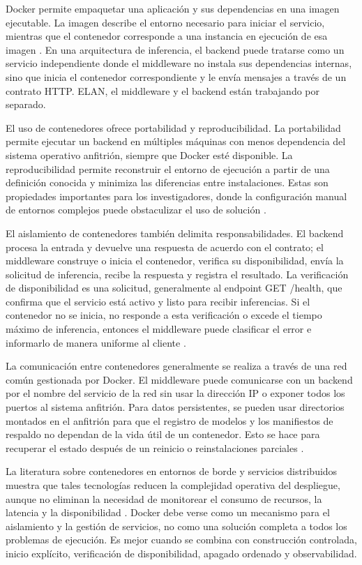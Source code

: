 Docker permite empaquetar una aplicación y sus dependencias en una imagen ejecutable. La imagen describe el entorno necesario para iniciar el servicio, mientras que el contenedor corresponde a una instancia en ejecución de esa imagen \cite{docker2026overview}. En una arquitectura de inferencia, el backend puede tratarse como un servicio independiente donde el middleware no instala sus dependencias internas, sino que inicia el contenedor correspondiente y le envía mensajes a través de un contrato HTTP. ELAN, el middleware y el backend están trabajando por separado.

El uso de contenedores ofrece portabilidad y reproducibilidad. La portabilidad permite ejecutar un backend en múltiples máquinas con menos dependencia del sistema operativo anfitrión, siempre que Docker esté disponible. La reproducibilidad permite reconstruir el entorno de ejecución a partir de una definición conocida y minimiza las diferencias entre instalaciones. Estas son propiedades importantes para los investigadores, donde la configuración manual de entornos complejos puede obstaculizar el uso de solución \cite{docker2026overview,gupta2025performance}.

El aislamiento de contenedores también delimita responsabilidades. El backend procesa la entrada y devuelve una respuesta de acuerdo con el contrato; el middleware construye o inicia el contenedor, verifica su disponibilidad, envía la solicitud de inferencia, recibe la respuesta y registra el resultado. La verificación de disponibilidad es una solicitud, generalmente al endpoint GET /health, que confirma que el servicio está activo y listo para recibir inferencias. Si el contenedor no se inicia, no responde a esta verificación o excede el tiempo máximo de inferencia, entonces el middleware puede clasificar el error e informarlo de manera uniforme al cliente \cite{docker2026overview}.

La comunicación entre contenedores generalmente se realiza a través de una red común gestionada por Docker. El middleware puede comunicarse con un backend por el nombre del servicio de la red sin usar la dirección IP o exponer todos los puertos al sistema anfitrión. Para datos persistentes, se pueden usar directorios montados en el anfitrión para que el registro de modelos y los manifiestos de respaldo no dependan de la vida útil de un contenedor. Esto se hace para recuperar el estado después de un reinicio o reinstalaciones parciales \cite{docker2026overview}.

La literatura sobre contenedores en entornos de borde y servicios distribuidos muestra que tales tecnologías reducen la complejidad operativa del despliegue, aunque no eliminan la necesidad de monitorear el consumo de recursos, la latencia y la disponibilidad \cite{gupta2025performance}. Docker debe verse como un mecanismo para el aislamiento y la gestión de servicios, no como una solución completa a todos los problemas de ejecución. Es mejor cuando se combina con construcción controlada, inicio explícito, verificación de disponibilidad, apagado ordenado y observabilidad.

